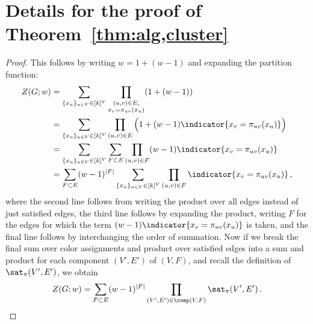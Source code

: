 \section{Details for the proof of Theorem~\ref{thm:alg,cluster}}
\begin{proof}
This follows by writing $w=1+(w-1)$ and expanding the partition function:
\begin{align*}
Z(G; w) 
  &= \sum_{\{x_u\}_{u\in V}\in[k]^V} \prod_{\substack{(u,v)\in E,\\ x_v=\pi_{uv}(x_u)}}(1 + (w-1))
\\&= \sum_{\{x_u\}_{u\in V}\in[k]^V} \prod_{(u,v)\in E}\Big(1 + (w-1)\indicator{x_v=\pi_{uv}(x_u)}\Big)
\\&= \sum_{\{x_u\}_{u\in V}\in[k]^V} \sum_{F\subset E}\prod_{(u,v)\in F}(w-1)\indicator{x_v=\pi_{uv}(x_u)}
\\&= \sum_{F\subset E}(w-1)^{|F|}\sum_{\{x_u\}_{u\in V}\in[k]^V} \prod_{(u,v)\in F}\indicator{x_v=\pi_{uv}(x_u)}\,,
\end{align*}
where the second line follows from writing the product over all edges instead of just satisfied edges, the third line follows by expanding the product, writing $F$ for the edges for which the term $(w-1)\indicator{x_v=\pi_{uv}(x_u)}$ is taken, and the final line follows by interchanging the order of summation.
Now if we break the final sum over color assignments and product over satisfied edges into a sum and product for each component $(V',E')$ of $(V,F)$, and recall the definition of $\sat_\pi(V',E')$, we obtain
\[
Z(G;w) = \sum_{F\subset E}(w-1)^{|F|}\prod_{(V',E')\in\comp(V,F)}\sat_\pi(V',E')\,.\qedhere
\]
\end{proof}
